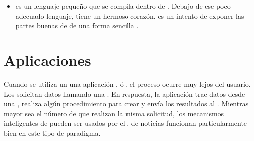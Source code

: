 \begin{itemize}
		\item
			\textbf{\coffeescript} es un lenguaje pequeño que se compila dentro de \javaScriptNAME. Debajo de ese poco adecuado lenguaje, \javaScriptNAME tiene un hermoso corazón. \coffeescript es un intento de exponer las partes buenas de \javaScriptNAME de una forma sencilla \cite{technology_coffeescript}.
		
			
	\end{itemize}

\section{Aplicaciones \webINT}\label{cap:estadoArte:section:web_app}

Cuando se utiliza un \backendAS \runningCPT una aplicación \javaNAME, \phpNAME ó \rails, el proceso ocurre muy lejos del usuario. Los \clientsAS solicitan datos llamando una \uriNAME. En respuesta, la aplicación trae datos desde una \dataBaseDB, realiza algún procedimiento para crear \htmlNAME y envía los resultados al \clientAS. Mientras mayor sea el número de \clientsAS que realizan la misma solicitud, los mecanismos inteligentes de \caching pueden ser usados por el \serverAS. \sitesINT de noticias funcionan particularmente bien en este tipo de paradigma.

